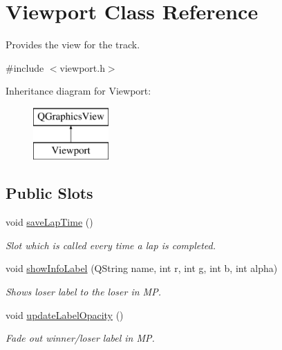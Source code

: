 \hypertarget{class_viewport}{}\section{Viewport Class Reference}
\label{class_viewport}


Provides the view for the track.  




{\ttfamily \#include $<$viewport.\+h$>$}

Inheritance diagram for Viewport\+:\begin{figure}[H]
\begin{center}
\leavevmode
\includegraphics[height=2.000000cm]{class_viewport}
\end{center}
\end{figure}
\subsection*{Public Slots}
\begin{DoxyCompactItemize}
\item 
void \mbox{\hyperlink{class_viewport_af6fe870956ea7f77a05d6287bafaa396}{save\+Lap\+Time}} ()
\begin{DoxyCompactList}\small\item\em Slot which is called every time a lap is completed. \end{DoxyCompactList}\item 
void \mbox{\hyperlink{class_viewport_aedf40f2474206479ff16782705c0e24a}{show\+Info\+Label}} (Q\+String name, int r, int g, int b, int alpha)
\begin{DoxyCompactList}\small\item\em Shows loser label to the loser in MP. \end{DoxyCompactList}\item 
void \mbox{\hyperlink{class_viewport_ae0531bc2b8462937158f67e44b85f0fb}{update\+Label\+Opacity}} ()
\begin{DoxyCompactList}\small\item\em Fade out winner/loser label in MP. \end{DoxyCompactList}\end{DoxyCompactItemize}

